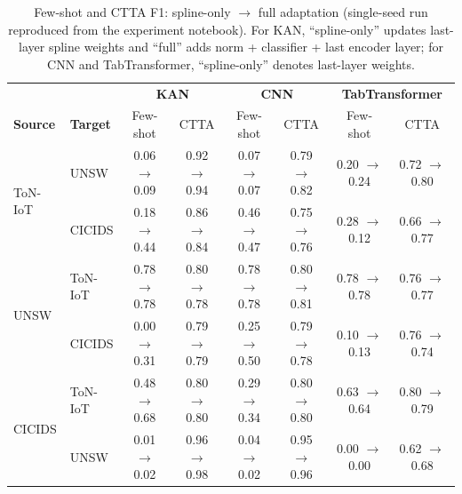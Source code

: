 \documentclass[10pt, conference, letterpaper]{IEEEtran}
\begin{document}
\begin{table}[t]
\centering
\caption{Few-shot and CTTA F1: spline-only $\rightarrow$ full adaptation (single-seed run reproduced from the experiment notebook). For KAN, ``spline-only'' updates last-layer spline weights and ``full'' adds norm + classifier + last encoder layer; for CNN and TabTransformer, ``spline-only'' denotes last-layer weights.}
\label{tab:fewshot_ctta_comparison}
\setlength{\tabcolsep}{4pt}
\begin{tabular}{l|l|cc|cc|cc}
\toprule
 & & \multicolumn{2}{c|}{\textbf{KAN}} & \multicolumn{2}{c|}{\textbf{CNN}} & \multicolumn{2}{c}{\textbf{TabTransformer}} \\
\textbf{Source} & \textbf{Target} & Few-shot & CTTA & Few-shot & CTTA & Few-shot & CTTA \\
\midrule
\multirow{2}{*}{ToN-IoT}
    & UNSW    & 0.06 $\rightarrow$ 0.09 & 0.92 $\rightarrow$ 0.94 & 0.07 $\rightarrow$ 0.07 & 0.79 $\rightarrow$ 0.82 & 0.20 $\rightarrow$ 0.24 & 0.72 $\rightarrow$ 0.80 \\
    & CICIDS  & 0.18 $\rightarrow$ 0.44 & 0.86 $\rightarrow$ 0.84 & 0.46 $\rightarrow$ 0.47 & 0.75 $\rightarrow$ 0.76 & 0.28 $\rightarrow$ 0.12 & 0.66 $\rightarrow$ 0.77 \\
\midrule
\multirow{2}{*}{UNSW}
    & ToN-IoT & 0.78 $\rightarrow$ 0.78 & 0.80 $\rightarrow$ 0.78 & 0.78 $\rightarrow$ 0.78 & 0.80 $\rightarrow$ 0.81 & 0.78 $\rightarrow$ 0.78 & 0.76 $\rightarrow$ 0.77 \\
    & CICIDS  & 0.00 $\rightarrow$ 0.31 & 0.79 $\rightarrow$ 0.79 & 0.25 $\rightarrow$ 0.50 & 0.79 $\rightarrow$ 0.78 & 0.10 $\rightarrow$ 0.13 & 0.76 $\rightarrow$ 0.74 \\
\midrule
\multirow{2}{*}{CICIDS}
    & ToN-IoT & 0.48 $\rightarrow$ 0.68 & 0.80 $\rightarrow$ 0.80 & 0.29 $\rightarrow$ 0.34 & 0.80 $\rightarrow$ 0.80 & 0.63 $\rightarrow$ 0.64 & 0.80 $\rightarrow$ 0.79 \\
    & UNSW    & 0.01 $\rightarrow$ 0.02 & 0.96 $\rightarrow$ 0.98 & 0.04 $\rightarrow$ 0.02 & 0.95 $\rightarrow$ 0.96 & 0.00 $\rightarrow$ 0.00 & 0.62 $\rightarrow$ 0.68 \\
\bottomrule
\end{tabular}
\end{table}
\end{document}
